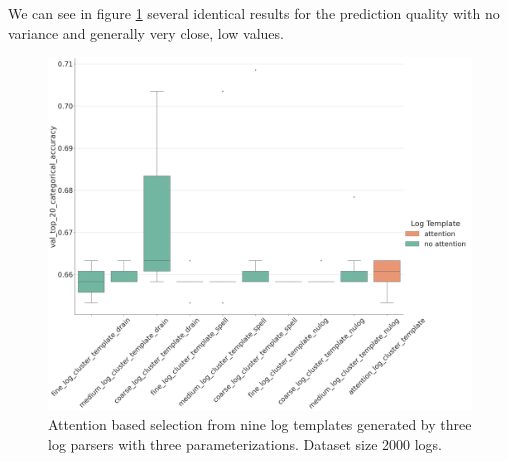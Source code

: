 We can see in figure \ref{fig:all_tbird} several identical results for the prediction quality with no variance and generally very close, low values. 

\begin{figure}[H]
    \centering
    \includegraphics[keepaspectratio=true,scale=0.2]{figures/5_results/all_tbird.png}
    \caption{Attention based selection from nine log templates generated by three log parsers with three parameterizations. Dataset size 2000 logs.}
    \label{fig:all_tbird}
\end{figure}